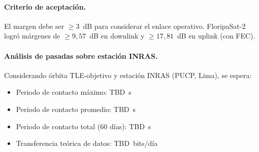 \paragraph{Criterio de aceptación.}
El margen debe ser $\ge 3$~dB para considerar el enlace operativo. FloripaSat-2 logró
márgenes de $\ge 9{,}57$~dB en downlink y $\ge 17{,}81$~dB en uplink (con FEC).

\paragraph{Análisis de pasadas sobre estación INRAS.}
Considerando órbita TLE-objetivo y estación INRAS (PUCP, Lima), se espera:
\begin{itemize}
    \item Periodo de contacto máximo: TBD~s
    \item Periodo de contacto promedio: TBD~s
    \item Periodo de contacto total (60 días): TBD~s
    \item Transferencia teórica de datos: TBD~bits/día
\end{itemize}
